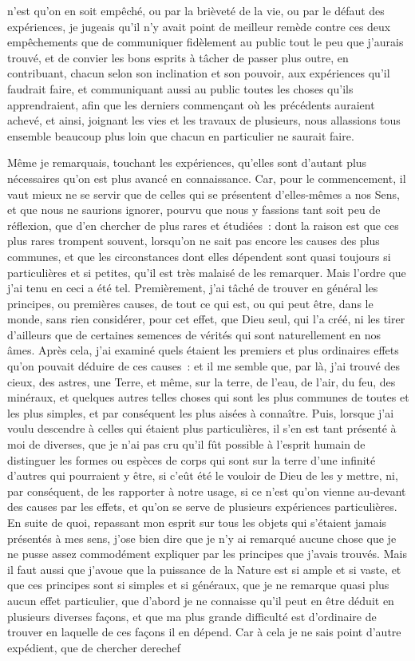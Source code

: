 \documentclass[french,twoside]{book} %
\begin{document}
n'est qu'on en soit empêché, ou par la brièveté de la vie, ou par le défaut des expériences, je jugeais qu'il n'y avait point de meilleur remède contre ces deux empêchements que de communiquer fidèlement au public tout le peu que j'aurais trouvé, et de convier les bons esprits à tâcher de passer plus outre, en contribuant, chacun selon son inclination et son pouvoir, aux expériences qu'il faudrait faire, et communiquant aussi au public toutes les choses qu'ils apprendraient, afin que les derniers commençant où les précédents auraient achevé, et ainsi, joignant les vies et les travaux de plusieurs, nous allassions tous ensemble beaucoup plus loin que chacun en particulier ne saurait faire.\par
Même je remarquais, touchant les expériences, qu'elles sont d'autant plus nécessaires qu'on est plus avancé en connaissance. Car, pour le commencement, il vaut mieux ne se servir que de celles qui se présentent d'elles-mêmes a nos Sens, et que nous ne saurions ignorer, pourvu que nous y fassions tant soit peu de réflexion, que d'en chercher de plus rares et étudiées : dont la raison est que ces plus rares trompent souvent, lorsqu'on ne sait pas encore les causes des plus communes, et que les circonstances dont elles dépendent sont quasi toujours si particulières et si petites, qu'il est très malaisé de les remarquer. Mais l'ordre que j'ai tenu en ceci a été tel. Premièrement, j'ai tâché de trouver en général les principes, ou premières causes, de tout ce qui est, ou qui peut être, dans le monde, sans rien considérer, pour cet effet, que Dieu seul, qui l'a créé, ni les tirer d'ailleurs que de certaines semences de vérités qui sont naturellement en nos âmes. Après cela, j'ai examiné quels étaient les premiers et plus ordinaires effets qu'on pouvait déduire de ces causes : et il me semble que, par là, j'ai trouvé des cieux, des astres, une Terre, et même, sur la terre, de l'eau, de l'air, du feu, des minéraux, et quelques autres telles choses qui sont les plus communes de toutes et les plus simples, et par conséquent les plus aisées à connaître. Puis, lorsque j'ai voulu descendre à celles qui étaient plus particulières, il s'en est tant présenté à moi de diverses, que je n'ai pas cru qu'il fût possible à l'esprit humain de distinguer les formes ou espèces de corps qui sont sur la terre d'une infinité d'autres qui pourraient y être, si c'eût été le vouloir de Dieu de les y mettre, ni, par conséquent, de les rapporter à notre usage, si ce n'est qu'on vienne au-devant des causes par les effets, et qu'on se serve de plusieurs expériences particulières. En suite de quoi, repassant mon esprit sur tous les objets qui s'étaient jamais présentés à mes sens, j'ose bien dire que je n'y ai remarqué aucune chose que je ne pusse assez commodément expliquer par les principes que j'avais trouvés. Mais il faut aussi que j'avoue que la puissance de la Nature est si ample et si vaste, et que ces principes sont si simples et si généraux, que je ne remarque quasi plus aucun effet particulier, que d'abord je ne connaisse qu'il peut en être déduit en plusieurs diverses façons, et que ma plus grande difficulté est d'ordinaire de trouver en laquelle de ces façons il en dépend. Car à cela je ne sais point d'autre expédient, que de chercher derechef 
\end{document}
